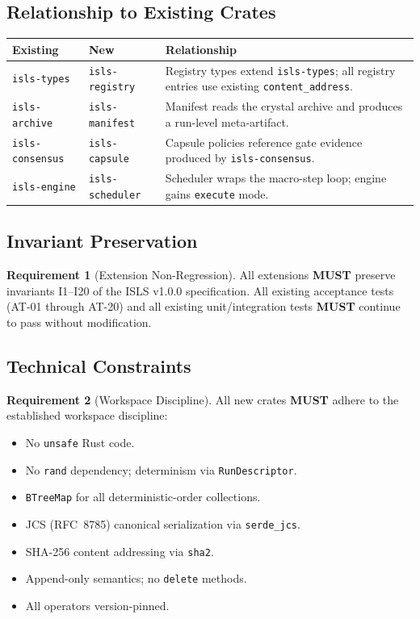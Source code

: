 \documentclass[11pt,a4paper,twoside]{article}
\theoremstyle{definition}
\newtheorem{requirement}{Requirement}[section]
\theoremstyle{plain}
\theoremstyle{remark}
\newcommand{\ISLS}{\textsf{ISLS}}
\begin{document}
\subsection{Relationship to Existing Crates}

\begin{tabularx}{\textwidth}{l l X}
\toprule
\textbf{Existing} & \textbf{New} & \textbf{Relationship} \\
\midrule
\texttt{isls-types} & \texttt{isls-registry} & Registry types extend
  \texttt{isls-types}; all registry entries use existing
  \texttt{content\_address}. \\
\texttt{isls-archive} & \texttt{isls-manifest} & Manifest reads the
  crystal archive and produces a run-level meta-artifact. \\
\texttt{isls-consensus} & \texttt{isls-capsule} & Capsule policies
  reference gate evidence produced by \texttt{isls-consensus}. \\
\texttt{isls-engine} & \texttt{isls-scheduler} & Scheduler wraps the
  macro-step loop; engine gains \texttt{execute} mode. \\
\bottomrule
\end{tabularx}

\subsection{Invariant Preservation}

\begin{requirement}[Extension Non-Regression]\label{req:nonregression}
All extensions \textbf{MUST} preserve invariants I1--I20 of the
\ISLS{} v1.0.0 specification. All existing acceptance tests (AT-01
through AT-20) and all existing unit/integration tests \textbf{MUST}
continue to pass without modification.
\end{requirement}

\subsection{Technical Constraints}

\begin{requirement}[Workspace Discipline]\label{req:workspace}
All new crates \textbf{MUST} adhere to the established workspace
discipline:
\begin{itemize}[nosep]
  \item No \texttt{unsafe} Rust code.
  \item No \texttt{rand} dependency; determinism via \texttt{RunDescriptor}.
  \item \texttt{BTreeMap} for all deterministic-order collections.
  \item JCS (RFC~8785) canonical serialization via \texttt{serde\_jcs}.
  \item SHA-256 content addressing via \texttt{sha2}.
  \item Append-only semantics; no \texttt{delete} methods.
  \item All operators version-pinned.
\end{itemize}
\end{requirement}
\end{document}
